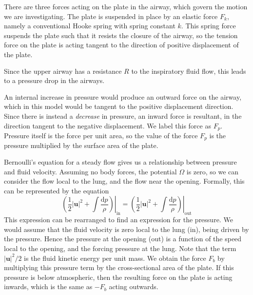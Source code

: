 \documentclass{article}
\begin{document}
There are three forces acting on the plate in the airway, which govern the motion we are investigating.
The plate is suspended in place by an elastic force $F_k$, namely a conventional Hooke spring with spring constant $k$.
This spring force suspends the plate such that it resists the closure of the airway,
so the tension force on the plate is acting tangent to the direction of positive displacement of the plate.


Since the upper airway has a resistance $R$ to the inspiratory fluid flow,
this leads to a pressure drop in the airways. %

An internal increase in pressure would produce an outward force on the airway,
which in this model would be tangent to the positive displacement direction.
Since there is instead a \textit{decrease} in pressure, an inward force is resultant,
in the direction tangent to the negative displacement. We label this force as $F_p$.
Pressure itself is the force per unit area,
so the value of the force $F_p$ is the pressure multiplied by the surface area of the plate.

Bernoulli's equation for a steady flow gives us a relationship between pressure and fluid velocity.
Assuming no body forces, the potential $\Omega$ is zero,
so we can consider the flow local to the lung, and the flow near the opening.
Formally, this can be represented by the equation
\begin{equation}
    \left.\left(\frac{1}{2}|\mathbf{u}|^2 + \int \frac{\mathrm{d}p}{\rho}\right)\right|_\mathrm{in} = \left.\left(\frac{1}{2}|\mathbf{u}|^2 + \int \frac{\mathrm{d}p}{\rho}\right)\right|_\mathrm{out}
\end{equation}
This expression can be rearranged to find an expression for the pressure.
We would assume that the fluid velocity is zero local to the lung (in),
being driven by the pressure.
Hence the pressure at the opening (out) is a function of the speed local to the opening,
and the forcing pressure at the lung.
Note that the term $|\mathbf{u}|^2/2$ is the fluid kinetic energy per unit mass.
We obtain the force $F_b$ by multiplying this pressure term by the cross-sectional area of the plate.
If this pressure is below atmospheric,
then the resulting force on the plate is acting inwards,
which is the same as $-F_b$ acting outwards.
\end{document}
